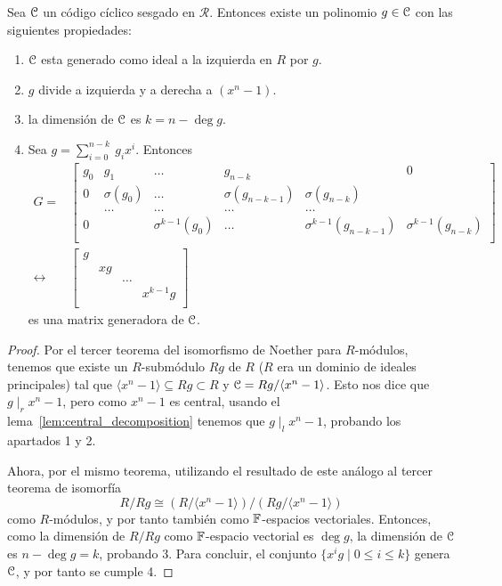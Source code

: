 \begin{theorem}
Sea \(\mathcal{C}\) un código cíclico sesgado en \(\mathcal{R}\). Entonces existe un polinomio \(g \in \mathcal{C}\) con las siguientes propiedades:

\begin{enumerate}
    \item \(\mathcal{C}\) esta generado como ideal a la izquierda en \(R\) por \(g\).
    \item \(g \) divide a izquierda y a derecha a \( (x^{n} - 1) \).
    \item la dimensión de \(\mathcal{C}\) es \(k = n - \deg g \).
    \item
    Sea \(g = \sum_{i=0}^{n-k}\ g_i x^{i}\). Entonces
    \[
    \begin{aligned}
    G =&
    \begin{bmatrix}
        g_0 & g_1 & \ldots & g_{n-k} & & 0 \\
        0 & \sigma(g_0) & \ldots & \sigma(g_{n-k-1}) & \sigma(g_{n-k}) & \\
          & \ldots &  \ldots &  \ldots & \ldots &\\
        0 &  & \sigma^{k-1}(g_0) & \ldots & \sigma^{k-1}(g_{n-k-1}) & \sigma^{k-1}(g_{n-k}) \\
    \end{bmatrix} \\
    \leftrightarrow &
    \begin{bmatrix}
       g & & & \\
       & xg & & \\
       & & \ldots & \\
       & &  & x^{k-1}g \\
    \end{bmatrix}
    \end{aligned}
    \]
    es una matrix generadora de \(\mathcal{C}\).
\end{enumerate}
\end{theorem}

\begin{proof}
Por el tercer teorema del isomorfismo de Noether para \(R\)-módulos, tenemos que existe un \(R\)-submódulo \(Rg\) de \(R\) (\(R\) era un dominio de ideales principales) tal que \(\langle x^{n} - 1 \rangle \subseteq Rg \subset R\) y \(\mathcal{C} = Rg / \langle x^{n} - 1 \rangle\). Esto nos dice que \(g \mid_r x^{n} -1\), pero como \(x^{n} - 1\) es central, usando el lema~\ref{lem:central_decomposition} tenemos que \(g  \mid_l x^{n} - 1\), probando los apartados 1 y 2.

Ahora, por el mismo teorema, utilizando el resultado de este análogo al tercer teorema de isomorfía
\[
R / Rg \cong (R / \langle x^{n} -1 \rangle) / (Rg / \langle x^{n} -1 \rangle)
\]
como \(R\)-módulos, y por tanto también como  \(\mathbb{F}\)-espacios vectoriales. Entonces, como la dimensión de \(R / Rg\) como  \(\mathbb{F}\)-espacio vectorial es \(\deg g\), la dimensión de \(\mathcal{C}\) es \(n - \deg g = k\), probando 3. Para concluir, el conjunto \(\{x^{i}g \mid 0 \le i \le k\}\) genera \(\mathcal{C}\), y por tanto se cumple 4.
\end{proof}

